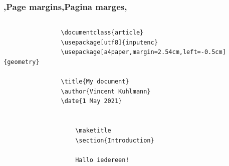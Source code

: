         
%         
            
%         

\unless\ifishandout
\begin{frame}[fragile]
    \frametitle{\lang,Page margins,Pagina marges,}
    \begin{columns}
        \begin{column}{0.67\textwidth}
            \begin{verbatim}
                \documentclass{article}
                \usepackage[utf8]{inputenc}
                \usepackage[a4paper,margin=2.54cm,left=-0.5cm]{geometry}
                
                \title{My document}
                \author{Vincent Kuhlmann}
                \date{1 May 2021}
                
                
                    \maketitle
                    \section{Introduction}
                    
                    Hallo iedereen!
                

\end{verbatim}
\end{column}
\end{columns}
\end{frame}
